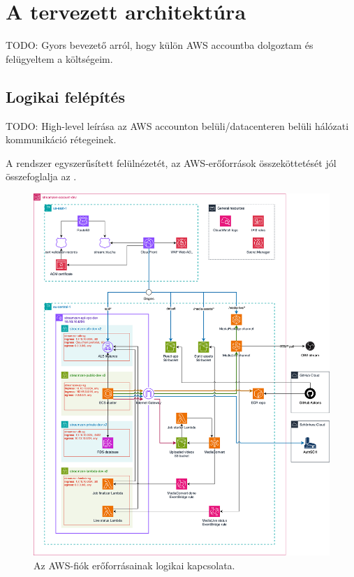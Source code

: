 \chapter{A tervezett architektúra}

TODO: Gyors bevezető arról, hogy külön AWS accountba dolgoztam és felügyeltem a költségeim.

\section{Logikai felépítés}

TODO: High-level leírása az AWS accounton belüli/datacenteren belüli hálózati kommunikáció rétegeinek.

A rendszer egyszerűsített felülnézetét, az AWS-erőforrások összeköttetését jól összefoglalja az .

\begin{figure}[ht]
	\centering
	\includegraphics[width=155mm, keepaspectratio]{figures/dipterv_architect.png}
	\caption{Az AWS-fiók erőforrásainak logikai kapcsolata.}
	\label{fig:architect}
\end{figure}

